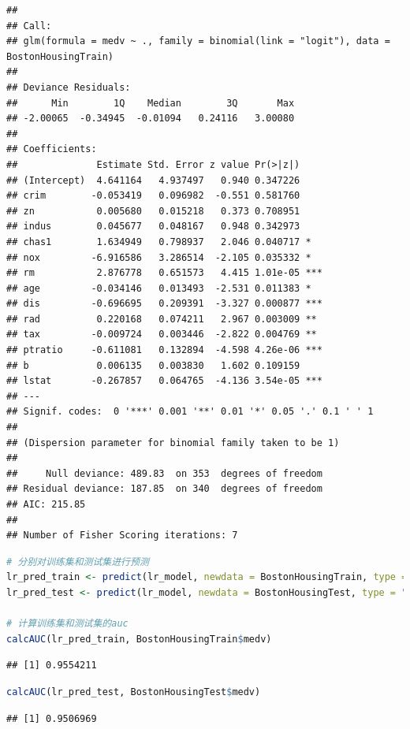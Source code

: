 \documentclass[]{ctexbook}
\begin{document}
\begin{lstlisting}
## 
## Call:
## glm(formula = medv ~ ., family = binomial(link = "logit"), data = BostonHousingTrain)
## 
## Deviance Residuals: 
##      Min        1Q    Median        3Q       Max  
## -2.00065  -0.34945  -0.01094   0.24116   3.00080  
## 
## Coefficients:
##              Estimate Std. Error z value Pr(>|z|)    
## (Intercept)  4.641164   4.937497   0.940 0.347226    
## crim        -0.053419   0.096982  -0.551 0.581760    
## zn           0.005680   0.015218   0.373 0.708951    
## indus        0.045677   0.048167   0.948 0.342973    
## chas1        1.634949   0.798937   2.046 0.040717 *  
## nox         -6.916586   3.286514  -2.105 0.035332 *  
## rm           2.876778   0.651573   4.415 1.01e-05 ***
## age         -0.034146   0.013493  -2.531 0.011383 *  
## dis         -0.696695   0.209391  -3.327 0.000877 ***
## rad          0.220168   0.074211   2.967 0.003009 ** 
## tax         -0.009724   0.003446  -2.822 0.004769 ** 
## ptratio     -0.611081   0.132894  -4.598 4.26e-06 ***
## b            0.006135   0.003830   1.602 0.109159    
## lstat       -0.267857   0.064765  -4.136 3.54e-05 ***
## ---
## Signif. codes:  0 '***' 0.001 '**' 0.01 '*' 0.05 '.' 0.1 ' ' 1
## 
## (Dispersion parameter for binomial family taken to be 1)
## 
##     Null deviance: 489.83  on 353  degrees of freedom
## Residual deviance: 187.85  on 340  degrees of freedom
## AIC: 215.85
## 
## Number of Fisher Scoring iterations: 7
\end{lstlisting}

\begin{lstlisting}[language=R]
# 分别对训练集和测试集进行预测
lr_pred_train <- predict(lr_model, newdata = BostonHousingTrain, type = "response")
lr_pred_test <- predict(lr_model, newdata = BostonHousingTest, type = "response")

# 计算训练集和测试集的auc
calcAUC(lr_pred_train, BostonHousingTrain$medv)
\end{lstlisting}

\begin{lstlisting}
## [1] 0.9554211
\end{lstlisting}

\begin{lstlisting}[language=R]
calcAUC(lr_pred_test, BostonHousingTest$medv)
\end{lstlisting}

\begin{lstlisting}
## [1] 0.9506969
\end{lstlisting}
\end{document}
